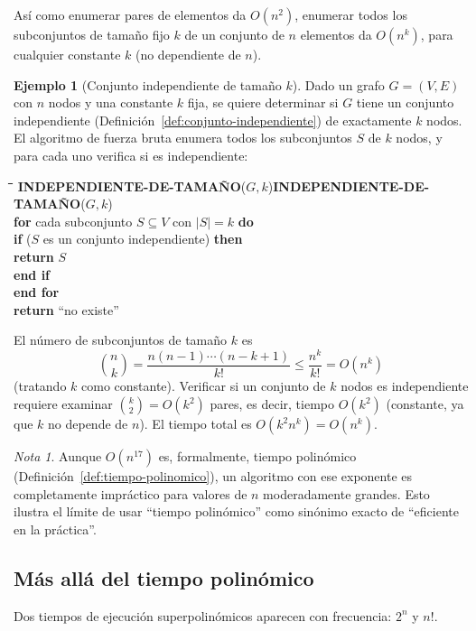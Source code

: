\documentclass[12pt, spanish, oneside, openany]{book}
\newcommand{\pl}[1]{\makebox[1.6em][r]{\texttt{\footnotesize #1}}\hspace{0.9em}}
\newenvironment{pseudo}[1]{%
  \begin{center}%
  \begin{mdframed}[style=pseudobox]%
  \small
  \begin{tabbing}%
  \hspace{2.5em}\=\hspace{1.5em}\=\hspace{1.5em}\=\hspace{1.5em}\=\hspace{1.5em}\=\kill
  \def\pseudotitulo{#1}\ifx\pseudotitulo\empty\else#1\\[3pt]\fi}%
  {\end{tabbing}\end{mdframed}\end{center}}
\theoremstyle{uprightplain}
\theoremstyle{definition}
\newtheorem{ejemplo}[teorema]{Ejemplo}
\theoremstyle{remark}
\newtheorem{nota}[teorema]{Nota}
\theoremstyle{definition}
\begin{document}
Así como enumerar pares de elementos da $O(n^2)$, enumerar todos los subconjuntos de tamaño fijo $k$ de un conjunto de $n$ elementos da $O(n^k)$, para cualquier constante $k$ (no dependiente de $n$).

\begin{ejemplo}[Conjunto independiente de tamaño $k$]
\label{ej:ind-set-k}
Dado un grafo $G=(V,E)$ con $n$ nodos y una constante $k$ fija, se quiere determinar si $G$ tiene un conjunto independiente (Definición~\ref{def:conjunto-independiente}) de exactamente $k$ nodos. El algoritmo de fuerza bruta enumera todos los subconjuntos $S$ de $k$ nodos, y para cada uno verifica si es independiente:
\begin{pseudo}{\textbf{INDEPENDIENTE-DE-TAMAÑO}($G,k$)}
\pl{1}\> \textbf{for} cada subconjunto $S \subseteq V$ con $|S|=k$ \textbf{do}\\
\pl{2}\>\> \textbf{if} ($S$ es un conjunto independiente) \textbf{then}\\
\pl{3}\>\>\> \textbf{return} $S$\\
\pl{4}\>\> \textbf{end if}\\
\pl{5}\> \textbf{end for}\\
\pl{6}\> \textbf{return} ``no existe''
\end{pseudo}
El número de subconjuntos de tamaño $k$ es
\[
\binom{n}{k} = \frac{n(n-1)\cdots(n-k+1)}{k!} \le \frac{n^k}{k!} = O(n^k)
\]
(tratando $k$ como constante). Verificar si un conjunto de $k$ nodos es independiente requiere examinar $\binom{k}{2}=O(k^2)$ pares, es decir, tiempo $O(k^2)$ (constante, ya que $k$ no depende de $n$). El tiempo total es $O(k^2 n^k)=O(n^k)$.
\end{ejemplo}

\begin{nota}
Aunque $O(n^{17})$ es, formalmente, tiempo polinómico (Definición~\ref{def:tiempo-polinomico}), un algoritmo con ese exponente es completamente impráctico para valores de $n$ moderadamente grandes. Esto ilustra el límite de usar ``tiempo polinómico'' como sinónimo exacto de ``eficiente en la práctica''.
\end{nota}

\subsection{Más allá del tiempo polinómico}

Dos tiempos de ejecución superpolinómicos aparecen con frecuencia: $2^n$ y $n!$.
\end{document}
